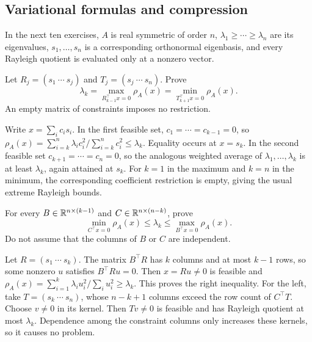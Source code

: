 \subsection*{Variational formulas and compression}
In the next ten exercises, $A$ is real symmetric of order $n$,
$\lambda_1\geqslant\cdots\geqslant\lambda_n$ are its eigenvalues,
$s_1,\ldots,s_n$ is a corresponding orthonormal eigenbasis, and every
Rayleigh quotient is evaluated only at a nonzero vector.

\begin{problem}\label{ex:12:exclude}
Let $R_j=(s_1\ \cdots\ s_j)$ and $T_j=(s_j\ \cdots\ s_n)$.
Prove
\[
\lambda_k=\max_{R_{k-1}^\top x=0}\rho_A(x)
=\min_{T_{k+1}^\top x=0}\rho_A(x).
\]
An empty matrix of constraints imposes no restriction.
\end{problem}
\begin{solution}
Write $x=\sum_i c_is_i$. In the first feasible set,
$c_1=\cdots=c_{k-1}=0$, so
$\rho_A(x)=\sum_{i=k}^n\lambda_i c_i^2/\sum_{i=k}^n c_i^2
\leqslant\lambda_k$. Equality occurs at $x=s_k$.
In the second feasible set $c_{k+1}=\cdots=c_n=0$, so the analogous
weighted average of $\lambda_1,\ldots,\lambda_k$ is at least
$\lambda_k$, again attained at $s_k$.
For $k=1$ in the maximum and $k=n$ in the minimum, the corresponding
coefficient restriction is empty, giving the usual extreme Rayleigh bounds.
\end{solution}

\begin{problem}
For every $B\in\mathbb R^{n\times(k-1)}$ and $C\in\mathbb R^{n\times(n-k)}$, prove
\[
\min_{C^\top x=0}\rho_A(x)\leqslant\lambda_k
\leqslant\max_{B^\top x=0}\rho_A(x).
\]
Do not assume that the columns of $B$ or $C$ are independent.
\end{problem}
\begin{solution}
Let $R=(s_1\ \cdots\ s_k)$. The matrix $B^\top R$ has $k$ columns
and at most $k-1$ rows, so some nonzero $u$ satisfies $B^\top Ru=0$.
Then $x=Ru\ne0$ is feasible and
$\rho_A(x)=\sum_{i=1}^k\lambda_i u_i^2/\sum_i u_i^2\geqslant\lambda_k$.
This proves the right inequality. For the left, take
$T=(s_k\ \cdots\ s_n)$, whose $n-k+1$ columns exceed the row count
of $C^\top T$. Choose $v\ne0$ in its kernel. Then $Tv\ne0$ is feasible
and has Rayleigh quotient at most $\lambda_k$. Dependence among the
constraint columns only increases these kernels, so it causes no problem.
\end{solution}

